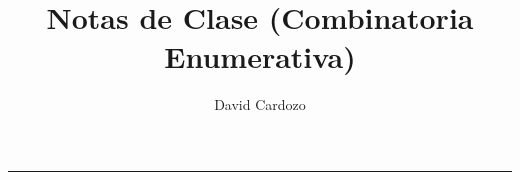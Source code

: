 \documentclass[notitlepage]{article}
\author{David Cardozo}
\title{Notas de Clase (Combinatoria Enumerativa)}
\begin{document}




\noindent\rule{\textwidth}{1pt}\\[-0.1cm]


\end{document}
